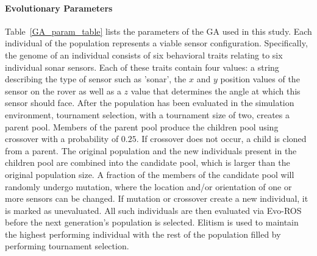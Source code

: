 

\paragraph{Evolutionary Parameters}
Table~\ref{GA_param_table} lists the parameters of
the GA used in this study.
%
%
Each individual of the population represents a viable sensor configuration.
Specifically, the genome of an individual consists of six behavioral traits relating to six individual sonar sensors. Each of these traits contain four values: a string describing the type of sensor such as 'sonar', the $x$ and $y$ position values of the sensor on the rover as well as a $z$ value that determines the angle at which this sensor should face.
%
After the  population has been evaluated in the simulation environment, tournament selection, with a tournament size of two, creates a parent pool. 
%
Members of the parent pool produce the children pool using crossover with a probability of $0.25$.
%
If crossover does not occur, a child is cloned from a parent.  
%
The original population and the new individuals present in the children pool are combined into the candidate pool, which is larger than the original population size. 
%
A fraction of the members of the candidate pool will randomly undergo mutation,
where the location and/or orientation of one or more sensors can be changed.
%
If mutation or crossover create a new individual, it is marked as unevaluated.  
%
All such individuals are then evaluated via Evo-ROS
before the next generation's population is selected.
%
Elitism is used to maintain the highest performing individual with the rest of the population filled by performing tournament selection.
\vspace{-0.1in}
